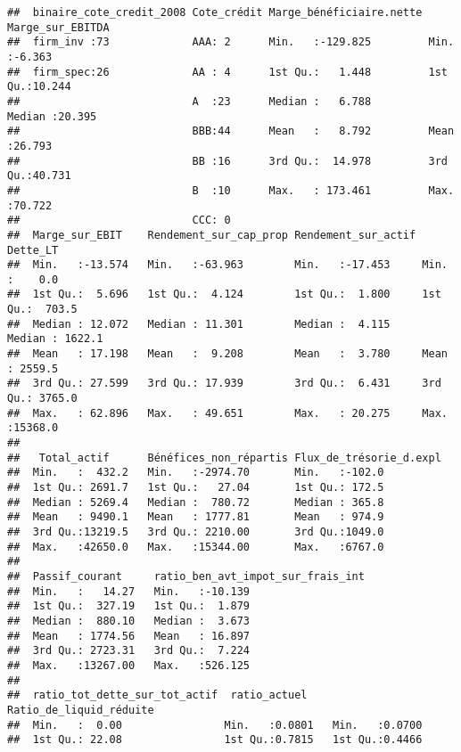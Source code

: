\documentclass[
]{article}
\begin{document}
\begin{verbatim}
##  binaire_cote_credit_2008 Cote_crédit Marge_bénéficiaire.nette Marge_sur_EBITDA
##  firm_inv :73             AAA: 2      Min.   :-129.825         Min.   :-6.363  
##  firm_spec:26             AA : 4      1st Qu.:   1.448         1st Qu.:10.244  
##                           A  :23      Median :   6.788         Median :20.395  
##                           BBB:44      Mean   :   8.792         Mean   :26.793  
##                           BB :16      3rd Qu.:  14.978         3rd Qu.:40.731  
##                           B  :10      Max.   : 173.461         Max.   :70.722  
##                           CCC: 0                                               
##  Marge_sur_EBIT    Rendement_sur_cap_prop Rendement_sur_actif    Dette_LT      
##  Min.   :-13.574   Min.   :-63.963        Min.   :-17.453     Min.   :    0.0  
##  1st Qu.:  5.696   1st Qu.:  4.124        1st Qu.:  1.800     1st Qu.:  703.5  
##  Median : 12.072   Median : 11.301        Median :  4.115     Median : 1622.1  
##  Mean   : 17.198   Mean   :  9.208        Mean   :  3.780     Mean   : 2559.5  
##  3rd Qu.: 27.599   3rd Qu.: 17.939        3rd Qu.:  6.431     3rd Qu.: 3765.0  
##  Max.   : 62.896   Max.   : 49.651        Max.   : 20.275     Max.   :15368.0  
##                                                                                
##   Total_actif      Bénéfices_non_répartis Flux_de_trésorie_d.expl
##  Min.   :  432.2   Min.   :-2974.70       Min.   :-102.0         
##  1st Qu.: 2691.7   1st Qu.:   27.04       1st Qu.: 172.5         
##  Median : 5269.4   Median :  780.72       Median : 365.8         
##  Mean   : 9490.1   Mean   : 1777.81       Mean   : 974.9         
##  3rd Qu.:13219.5   3rd Qu.: 2210.00       3rd Qu.:1049.0         
##  Max.   :42650.0   Max.   :15344.00       Max.   :6767.0         
##                                                                  
##  Passif_courant     ratio_ben_avt_impot_sur_frais_int
##  Min.   :   14.27   Min.   :-10.139                  
##  1st Qu.:  327.19   1st Qu.:  1.879                  
##  Median :  880.10   Median :  3.673                  
##  Mean   : 1774.56   Mean   : 16.897                  
##  3rd Qu.: 2723.31   3rd Qu.:  7.224                  
##  Max.   :13267.00   Max.   :526.125                  
##                                                      
##  ratio_tot_dette_sur_tot_actif  ratio_actuel    Ratio_de_liquid_réduite
##  Min.   :  0.00                Min.   :0.0801   Min.   :0.0700         
##  1st Qu.: 22.08                1st Qu.:0.7815   1st Qu.:0.4466         

\end{verbatim}
\end{document}
